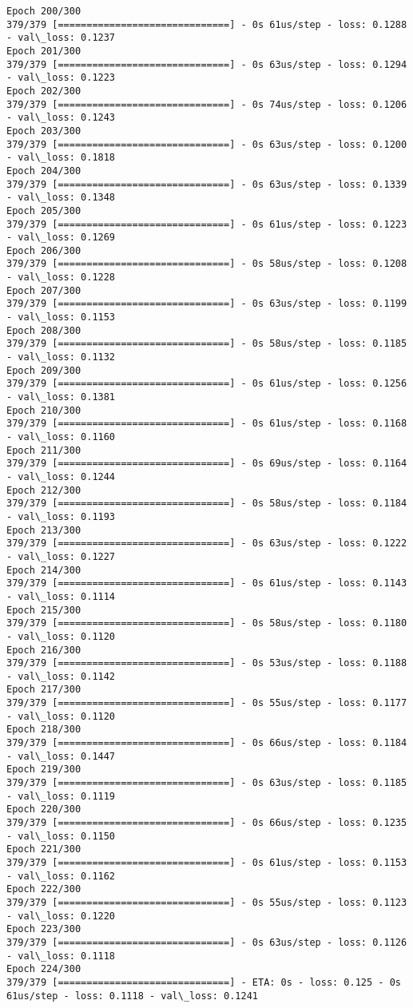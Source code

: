 \documentclass[11pt]{article}
\begin{document}
\begin{Verbatim}[commandchars=\\\{\}]
Epoch 200/300
379/379 [==============================] - 0s 61us/step - loss: 0.1288 - val\_loss: 0.1237
Epoch 201/300
379/379 [==============================] - 0s 63us/step - loss: 0.1294 - val\_loss: 0.1223
Epoch 202/300
379/379 [==============================] - 0s 74us/step - loss: 0.1206 - val\_loss: 0.1243
Epoch 203/300
379/379 [==============================] - 0s 63us/step - loss: 0.1200 - val\_loss: 0.1818
Epoch 204/300
379/379 [==============================] - 0s 63us/step - loss: 0.1339 - val\_loss: 0.1348
Epoch 205/300
379/379 [==============================] - 0s 61us/step - loss: 0.1223 - val\_loss: 0.1269
Epoch 206/300
379/379 [==============================] - 0s 58us/step - loss: 0.1208 - val\_loss: 0.1228
Epoch 207/300
379/379 [==============================] - 0s 63us/step - loss: 0.1199 - val\_loss: 0.1153
Epoch 208/300
379/379 [==============================] - 0s 58us/step - loss: 0.1185 - val\_loss: 0.1132
Epoch 209/300
379/379 [==============================] - 0s 61us/step - loss: 0.1256 - val\_loss: 0.1381
Epoch 210/300
379/379 [==============================] - 0s 61us/step - loss: 0.1168 - val\_loss: 0.1160
Epoch 211/300
379/379 [==============================] - 0s 69us/step - loss: 0.1164 - val\_loss: 0.1244
Epoch 212/300
379/379 [==============================] - 0s 58us/step - loss: 0.1184 - val\_loss: 0.1193
Epoch 213/300
379/379 [==============================] - 0s 63us/step - loss: 0.1222 - val\_loss: 0.1227
Epoch 214/300
379/379 [==============================] - 0s 61us/step - loss: 0.1143 - val\_loss: 0.1114
Epoch 215/300
379/379 [==============================] - 0s 58us/step - loss: 0.1180 - val\_loss: 0.1120
Epoch 216/300
379/379 [==============================] - 0s 53us/step - loss: 0.1188 - val\_loss: 0.1142
Epoch 217/300
379/379 [==============================] - 0s 55us/step - loss: 0.1177 - val\_loss: 0.1120
Epoch 218/300
379/379 [==============================] - 0s 66us/step - loss: 0.1184 - val\_loss: 0.1447
Epoch 219/300
379/379 [==============================] - 0s 63us/step - loss: 0.1185 - val\_loss: 0.1119
Epoch 220/300
379/379 [==============================] - 0s 66us/step - loss: 0.1235 - val\_loss: 0.1150
Epoch 221/300
379/379 [==============================] - 0s 61us/step - loss: 0.1153 - val\_loss: 0.1162
Epoch 222/300
379/379 [==============================] - 0s 55us/step - loss: 0.1123 - val\_loss: 0.1220
Epoch 223/300
379/379 [==============================] - 0s 63us/step - loss: 0.1126 - val\_loss: 0.1118
Epoch 224/300
379/379 [==============================] - ETA: 0s - loss: 0.125 - 0s 61us/step - loss: 0.1118 - val\_loss: 0.1241

\end{Verbatim}
\end{document}
